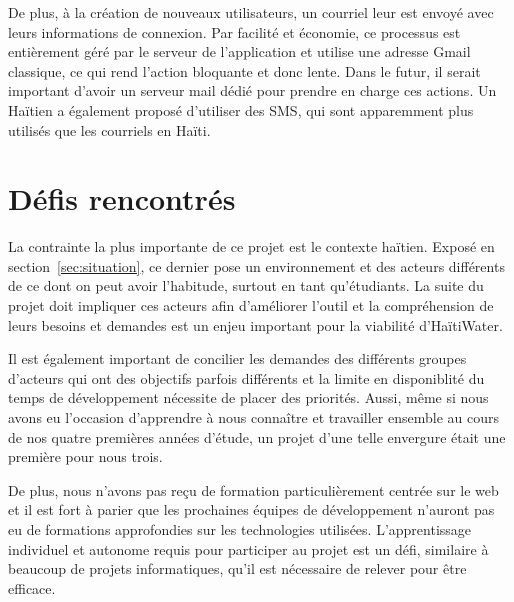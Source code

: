 \documentclass{EPL-master-thesis-covers-FR}
\begin{document}
			De plus, à la création de nouveaux utilisateurs, un courriel leur est envoyé avec leurs informations de connexion. Par facilité et économie, ce processus est entièrement géré par le serveur de l'application et utilise une adresse Gmail classique, ce qui rend l'action bloquante et donc lente. Dans le futur, il serait important d'avoir un serveur mail dédié pour prendre en charge ces actions. Un Haïtien a également proposé d'utiliser des SMS, qui sont apparemment plus utilisés que les courriels en Haïti.

		\section{Défis rencontrés}

			La contrainte la plus importante de ce projet est le contexte haïtien. Exposé en section~\ref{sec:situation}, ce dernier pose un environnement et des acteurs différents de ce dont on peut avoir l'habitude, surtout en tant qu'étudiants. La suite du projet doit impliquer ces acteurs afin d'améliorer l'outil et la compréhension de leurs besoins et demandes est un enjeu important pour la viabilité d'HaïtiWater.

			Il est également important de concilier les demandes des différents groupes d'acteurs qui ont des objectifs parfois différents et la limite en disponiblité du temps de développement nécessite de placer des priorités. Aussi, même si nous avons eu l'occasion d'apprendre à nous connaître et travailler ensemble au cours de nos quatre premières années d'étude, un projet d'une telle envergure était une première pour nous trois.


			De plus, nous n'avons pas reçu de formation particulièrement centrée sur le web et il est fort à parier que les prochaines équipes de développement n'auront pas eu de formations approfondies sur les technologies utilisées. L'apprentissage individuel et autonome requis pour participer au projet est un défi, similaire à beaucoup de projets informatiques, qu'il est nécessaire de relever pour être efficace.
\end{document}
